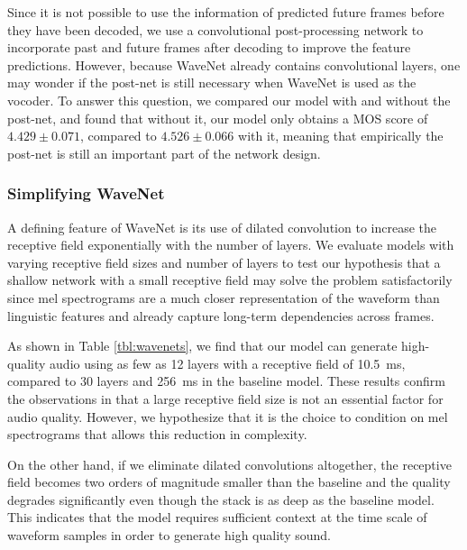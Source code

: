 Since it is not possible to use the information of predicted future frames
before they have been decoded, we use a convolutional post-processing network
to incorporate past and future frames after decoding to improve the feature
predictions. However, because WaveNet already contains convolutional layers,
one may wonder if the post-net is still necessary when WaveNet is used as the
vocoder. To answer this
question, we compared our model with and without the post-net, and found that
without it, our model only obtains a MOS score of $4.429 \pm 0.071$, compared to
$4.526 \pm 0.066$ with it, meaning that empirically the post-net is still an
important part of the network design.


\subsubsection{Simplifying WaveNet}
\label{ssec:simplifywavenet}

A defining feature of WaveNet is its use of dilated convolution to increase
the receptive field exponentially with the number of layers.
%
We evaluate models with varying receptive field sizes and number of
layers to test our hypothesis that a shallow network with a small receptive
field may solve the problem satisfactorily since mel spectrograms are a much
closer representation of the waveform than linguistic features and already
capture long-term dependencies across frames.

As shown in Table \ref{tbl:wavenets}, we find that our model can generate
high-quality audio using as few as 12 layers with a receptive field of
10.5~ms, compared to 30 layers and 256~ms in the baseline model. These
results confirm the observations in \cite{DBLP:journals/corr/ArikCCDGKLMRSS17}
that a large receptive field size is not an essential factor for audio
quality. However, we hypothesize that it is the choice to condition on mel
spectrograms that allows this reduction in complexity.

On the other hand, if we eliminate dilated convolutions altogether, the
receptive field becomes two orders of magnitude smaller than the baseline and
the quality degrades significantly even though the stack is as deep as the
baseline model.
%
This indicates that the model requires sufficient context at the time scale of
waveform samples in order to generate high quality sound.

